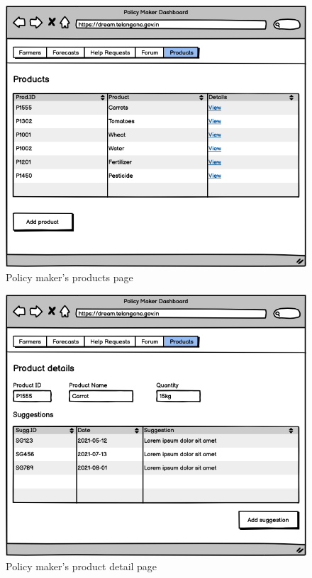 \documentclass[10pt]{article} %
\begin{document}
\begin{figure}[h]
    \centering
    \includegraphics[scale=0.4]{images/uimockups/pm_products.png}
    \caption{Policy maker's products page}
    \label{fig:ui_pm_products}
\end{figure}
\begin{figure}[h]
    \centering
    \includegraphics[scale=0.4]{images/uimockups/pm_productdetail.png}
    \caption{Policy maker's product detail page}
    \label{fig:ui_pm_productdetail}
\end{figure}
\end{document}
